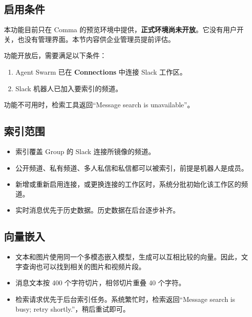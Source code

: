 \documentclass[UTF8,a4paper,11pt]{ctexart}
\begin{document}
\subsection{启用条件}

\begin{warn}[当前可用范围]
本功能目前只在 Comma 的预览环境中提供，\textbf{正式环境尚未开放}。它没有用户开关，也没有管理界面。本节内容供企业管理员提前评估。
\end{warn}

功能开放后，需要满足以下条件：

\begin{enumerate}
  \item Agent Swarm 已在 \textbf{Connections} 中连接 Slack 工作区。
  \item Slack 机器人已加入要索引的频道。
\end{enumerate}

功能不可用时，检索工具返回“Message search is unavailable”。

\subsection{索引范围}

\begin{itemize}
  \item 索引覆盖 Group 的 Slack 连接所镜像的频道。
  \item 公开频道、私有频道、多人私信和私信都可以被索引，前提是机器人是成员。
  \item 新增或重新启用连接，或更换连接的工作区时，系统分批初始化该工作区的频道。
  \item 实时消息优先于历史数据。历史数据在后台逐步补齐。
\end{itemize}

\subsection{向量嵌入}

\begin{itemize}
  \item 文本和图片使用同一个多模态嵌入模型，生成可以互相比较的向量。因此，文字查询也可以找到相关的图片和视频片段。
  \item 消息文本按 400 个字符切片，相邻切片重叠 40 个字符。
  \item 检索请求优先于后台索引任务。系统繁忙时，检索返回“Message search is busy; retry shortly.”，稍后重试即可。
\end{itemize}
\end{document}
